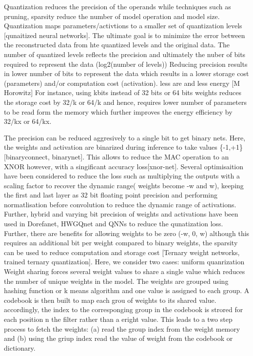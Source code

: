 Quantization reduces the precision of the operands while techniques such as pruning, sparsity reduce the number of model operation and model size.
Quantization maps parameters/activtions to a smaller set of quantization levels [qunaitized neural networks].
The ultimate goal is to minimize the error between the reconstructed data from hte quantized levels and the original data.
The number of quantized levels reflects the precision and ultimately the nuber of bits required to represent the data (log2(number of levels))
Reducing precision results in lower number of bits to represent the data which results in a lower storage cost (parameters) and/or computation cost (activation). less are and less energy [M Horowitz]
For instance, using kbits instead of 32 bits or 64 bits weights reduces the storage cost by 32/k or 64/k and hence, requires lower number of parameters to be read form the memory which further improves the energy efficiency by 32/kx or 64/kx.

The precision can be reduced aggresively to a single bit to get binary nets. Here, the weights  and activation are binarized during inference to take values \{-1,+1\} [binaryconnect, binarynet]. This allows to reduce the MAC operation to an XNOR however, with a singificant accuracy loss[xnor-net].
Several optimisaition have been considered to reduce the loss such as multiplying the outputs with a scaling factor to recover the dynamic range( weights become -w and w), keeping the first and last layer as 32 bit floating point precision and performing normatlisation before convolution to reduce the dynamic range of activations.
Further, hybrid and varying bit precision of weights and activations have been used in Dorefanet, HWGQnet and QNNs to reduce the qunatization loss.
Further, there are benefits for allowing weights to be zero (-w, 0, w) although this requires an additional bit per weight compared to binary weights, the sparsity can be used to reduce computation and storage cost [Ternary weight networks, trained ternary quantization].
Here, we consider two cases: uniform quanrization
Weight sharing forces several weight values to share a single value which reduces the number of unique weights in the model.
The weights are grouped using hashing function or k means algorithm and one value is assigned to each group.
A codebook is then built to map each grou of weights to its shared value. accordingly, the index to the corresponging group in the codebook is strored for each position n the filter rather than a eright value. This leads to a two step process to fetch the weights:
(a) read the group index from the weight memory and (b) using the griup index read the value of weight from the codebook or dictionary.
